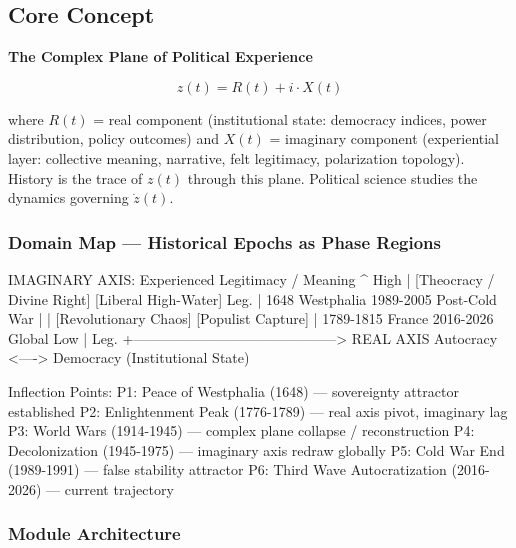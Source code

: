 \documentclass[11pt,letterpaper]{article}
\begin{document}
\subsection{Core Concept}

\begin{goldbox}
\textbf{The Complex Plane of Political Experience}

\[
  z(t) = R(t) + i \cdot X(t)
\]

where $R(t)$ = real component (institutional state: democracy indices, power distribution, policy outcomes) and $X(t)$ = imaginary component (experiential layer: collective meaning, narrative, felt legitimacy, polarization topology). History is the trace of $z(t)$ through this plane. Political science studies the dynamics governing $\dot{z}(t)$.
\end{goldbox}

\subsubsection{Domain Map --- Historical Epochs as Phase Regions}

\begin{asciibox}
IMAGINARY AXIS: Experienced Legitimacy / Meaning
     ^
High |  [Theocracy / Divine Right]    [Liberal High-Water]
Leg. |  1648 Westphalia               1989-2005 Post-Cold War
     |
     |  [Revolutionary Chaos]          [Populist Capture]
     |  1789-1815 France               2016-2026 Global
Low  |
Leg. +--------------------------------------------> REAL AXIS
          Autocracy <----> Democracy (Institutional State)
          
Inflection Points:
  P1: Peace of Westphalia (1648)  — sovereignty attractor established
  P2: Enlightenment Peak (1776-1789) — real axis pivot, imaginary lag
  P3: World Wars (1914-1945)  — complex plane collapse / reconstruction
  P4: Decolonization (1945-1975) — imaginary axis redraw globally
  P5: Cold War End (1989-1991)  — false stability attractor
  P6: Third Wave Autocratization (2016-2026) — current trajectory
\end{asciibox}

\subsubsection{Module Architecture}
\end{document}
